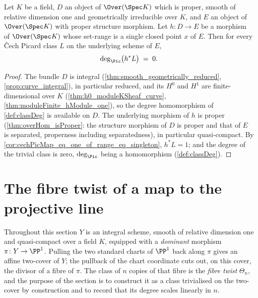 \begin{theorem}
  \label{thm:classDeg_cechPicMap_eq_zero_of_range_eq_singleton}
  \leanok
  Let \(K\) be a field, \(D\) an object of \(\Over(\Spec K)\) which is proper, smooth
  of relative dimension one and geometrically irreducible over \(K\), and \(E\) an
  object of \(\Over(\Spec K)\) with proper structure morphism. Let \(h : D \to E\) be
  a morphism of \(\Over(\Spec K)\) whose set-range is a single closed point \(x\) of
  \(E\). Then for every \v Cech Picard class \(L\) on the underlying scheme of \(E\),
  \[
    \deg_{\Pic}\bigl(h^{*}L\bigr) \;=\; 0 .
  \]
\end{theorem}
\begin{proof}
  \leanok
  The bundle \(D\) is integral (\ref{thm:smooth_geometrically_reduced},
  \ref{prop:curve_integral}), in particular reduced, and its \(H^0\) and \(H^1\) are
  finite-dimensional over \(K\) (\ref{thm:h0_moduleKSheaf_curve},
  \ref{thm:moduleFinite_hModule_one}), so the degree homomorphism of
  \ref{def:classDeg} is available on \(D\). The underlying morphism of \(h\) is proper
  (\ref{thm:overHom_isProper}: the structure morphism of \(D\) is proper and that of
  \(E\) is separated, properness including separatedness), in particular
  quasi-compact. By \ref{cor:cechPicMap_eq_one_of_range_eq_singleton},
  \(h^{*}L = 1\); and the degree of the trivial class is zero, \(\deg_{\Pic}\) being a
  homomorphism (\ref{def:classDeg}).
\end{proof}

\section{The fibre twist of a map to the projective line}

Throughout this section \(Y\) is an integral scheme, smooth of relative dimension one and
quasi-compact over a field \(K\), equipped with a \emph{dominant} morphism \(\pi \colon Y \to
\PP^1\). Pulling the two standard charts of \(\PP^1\) back along \(\pi\) gives an affine two-cover
of \(Y\); the pullback of the chart coordinate cuts out, on this cover, the divisor of a fibre of
\(\pi\). The class of \(n\) copies of that fibre is the \emph{fibre twist} \(\Theta_n\), and the
purpose of the section is to construct it as a class trivialised on the two-cover by construction
and to record that its degree scales linearly in \(n\).


